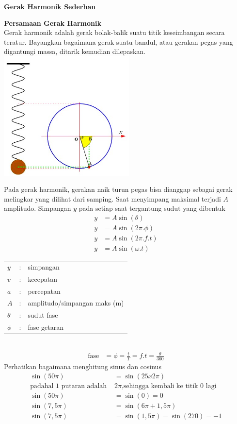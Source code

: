 \documentclass[10pt,a4paper]{extarticle}
\begin{document}
 \textbf{Gerak Harmonik Sederhan} \phantom{ini nama siswa yang aaamengerjakan soal kuis ini }  

\begin{multicols*}{2}\raggedcolumns
\textbf{Persamaan Gerak Harmonik}\\
Gerak harmonik adalah gerak bolak-balik suatu titik keseimbangan secara teratur. Bayangkan bagaimana gerak suatu bandul, atau gerakan pegas yang digantungi massa, ditarik kemudian dilepaskan.\\
\includegraphics[height=6.5cm]{pic/kuis-ghs1}

Pada gerak harmonik, gerakan naik turun pegas bisa dianggap sebagai gerak melingkar yang dilihat dari samping. Saat menyimpang maksimal terjadi $A$ amplitudo. Simpangan $y$ pada setiap saat tergantung sudut yang dibentuk
\begin{align*}
y&=A\sin(\theta)\\
y&=A\sin(2\pi.\phi)\\
y&=A\sin(2\pi.f.t)\\
y&=A\sin(\omega.t)
\end{align*}
\setlength{\tabcolsep}{0.1\tabcolsep}

\begin{tabular}{p{0.5cm} p{1mm} p{6cm}}
$y$ &:& simpangan \\
$v$ &:& kecepatan \\
$a$ &:& percepatan \\
$A$ &:& amplitudo/simpangan maks (m)\\
$\theta$&:& sudut fase\\
$\phi$&:& fase getaran
\end{tabular}\\
\begin{align*}
\text{fase} &= \phi = \frac{t}{T}=f.t=\frac{\theta}{360}
\end{align*}
Perhatikan bagaimana menghitung sinus dan cosinus
\begin{align*}
\sin(50\pi) &= \sin(25x2\pi)\\
\text{padahal 1 putaran adalah }&2\pi\text{,sehingga kembali ke titik 0 lagi}\\
\sin(50\pi) &= \sin (0) = 0\\
\sin(7,5\pi) &= \sin (6\pi + 1,5\pi)\\
\sin(7,5\pi) &= \sin (1,5\pi) = \sin (270) = -1
\end{align*}


\end{multicols*}
\end{document}
